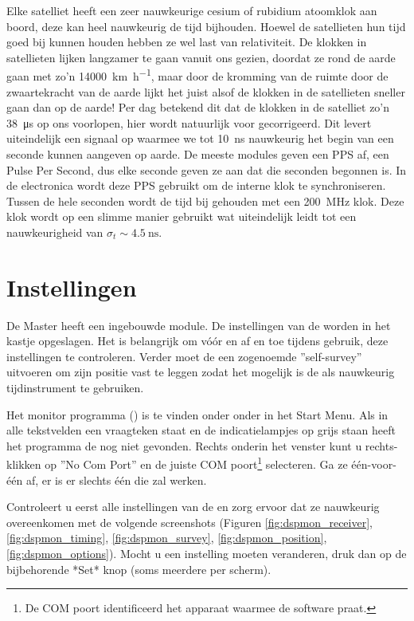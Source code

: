 Elke \gps satelliet heeft een zeer nauwkeurige cesium of rubidium
atoomklok aan boord, deze kan heel nauwkeurig de tijd bijhouden. Hoewel
de \gps satellieten hun tijd goed bij kunnen houden hebben ze wel last
van relativiteit. De klokken in \gps satellieten lijken langzamer te gaan
vanuit ons gezien, doordat ze rond de aarde gaan met zo'n
\SI{14000}{\kilo\meter\per\hour}, maar door de kromming van de ruimte
door de zwaartekracht van de aarde lijkt het juist alsof de klokken in de
\gps satellieten sneller gaan dan op de aarde! Per dag betekend dit dat
de klokken in de satelliet zo'n \SI{38}{\micro\second} op ons voorlopen,
hier wordt natuurlijk voor gecorrigeerd. Dit levert uiteindelijk een
signaal op waarmee we tot \SI{10}{\nano\second} nauwkeurig het begin van
een seconde kunnen aangeven op aarde. De meeste \gps modules geven een
PPS af, een Pulse Per Second, dus elke seconde geven ze aan dat die
seconden begonnen is. In de \hisparc electronica wordt deze PPS gebruikt
om de interne klok te synchroniseren. Tussen de hele seconden wordt de
tijd bij gehouden met een \SI{200}{\mega\hertz} klok. Deze klok wordt op
een slimme manier gebruikt wat uiteindelijk leidt tot een nauwkeurigheid
van $\sigma_t\sim\SI{4.5}{\nano\second}$.


\section{Instellingen}

De \hisparc Master heeft een ingebouwde \gps module. De instellingen van
de \gps worden in het kastje opgeslagen. Het is belangrijk om vóór en af
en toe tijdens gebruik, deze instellingen te controleren. Verder moet de
\gps een zogenoemde ''self-survey'' uitvoeren om zijn positie vast te
leggen zodat het mogelijk is de \gps als nauwkeurig tijdinstrument te
gebruiken.

Het \gps monitor programma (\dspmon) is te vinden onder onder \hisparc in
het Start Menu. Als in alle tekstvelden een vraagteken staat en de
indicatielampjes op grijs staan heeft het programma de \gps nog niet
gevonden. Rechts onderin het venster kunt u rechts-klikken op ''No Com
Port'' en de juiste COM poort\footnote{De COM poort identificeerd het
apparaat waarmee de software praat.} selecteren. Ga ze één-voor-één af,
er is er slechts één die zal werken.

Controleert u eerst alle instellingen van de \gps en zorg ervoor dat ze
nauwkeurig overeenkomen met de volgende screenshots (Figuren
\ref{fig:dspmon_receiver}, \ref{fig:dspmon_timing},
\ref{fig:dspmon_survey}, \ref{fig:dspmon_position},
\ref{fig:dspmon_options}). Mocht u een instelling moeten veranderen,
druk dan op de bijbehorende *Set* knop (soms meerdere per scherm).

